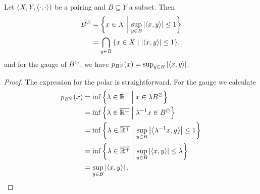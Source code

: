 \begin{lemma} \label{polarLemma}
Let $\left( X,Y,\left\langle \cdot,\cdot \right\rangle \right)$ be a pairing and $B\subseteq Y$ a subset. Then
\begin{align*}
B^{\pol} &= \setbuilder{x\in X}{\sup_{y\in B}\abspair{x,y} \leq 1} \\
&= \bigcap_{y\in B}\setbuilder{x\in X}{\abspair{x,y}\leq 1}.
\end{align*}
and for the gauge of $B^\oslash$, we have $p_{B^\oslash}(x) = \sup_{y\in B}\left|\left\langle x,y \right\rangle\right|$.
\end{lemma}
\begin{proof}
The expression for the polar is straightforward. For the gauge we calculate
\begin{align*}
p_{B^\pol}(x) &= \inf \setbuilder{\lambda\in\overline{\R^+}}{x\in \lambda B^\pol} \\
&= \inf \setbuilder{\lambda\in\overline{\R^+}}{\lambda^{-1}x\in B^\pol} \\
&= \inf \setbuilder{\lambda\in\overline{\R^+}}{\sup_{y\in B}\abspair{\lambda^{-1}x,y}\leq 1} \\
&= \inf \setbuilder{\lambda\in\overline{\R^+}}{\sup_{y\in B}\abspair{x,y}\leq \lambda} \\
&= \sup_{y\in B}\abspair{x,y}.
\end{align*}
\end{proof}

